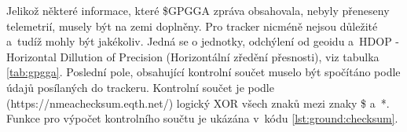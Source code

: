 \documentclass[twoside]{ctuthesis}
\theoremstyle{plain}
\theoremstyle{definition}
\theoremstyle{note}
\begin{document}
	

	

	Jelikož některé informace, které \$GPGGA zpráva obsahovala, nebyly přeneseny telemetrií, musely být na zemi doplněny. Pro tracker nicméně nejsou důležité a~tudíž mohly být jakékoliv. Jedná se o jednotky, odchýlení od geoidu a~HDOP - Horizontal Dillution of Precision (Horizontální zředění přesnosti), viz tabulka \ref{tab:gpgga}. Poslední pole, obsahující kontrolní součet muselo být spočítáno podle údajů posílaných do trackeru. Kontrolní součet je podle (https://nmeachecksum.eqth.net/) logický XOR všech znaků mezi znaky \$ a~*. Funkce pro výpočet kontrolního součtu je ukázána v~kódu \ref{lst:ground:checksum}.

	

\end{document}
